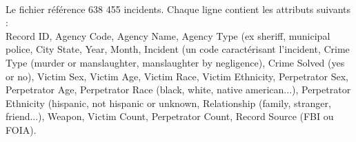 \documentclass[a4paper,10pt]{report}
\begin{document}
\paragraph{}
Le fichier référence 638 455 incidents. Chaque ligne contient les attributs suivants : \\

Record ID, Agency Code, Agency Name, Agency Type (ex sheriff, municipal police, City State, Year, Month, Incident 
(un code caractérisant l'incident, 
Crime Type (murder or manslaughter, manslaughter by negligence), Crime Solved (yes or no), Victim Sex, Victim Age, 
Victim Race, Victim Ethnicity, Perpetrator Sex, Perpetrator Age, Perpetrator Race (black, white, native american...), 
Perpetrator Ethnicity (hispanic, not hispanic or unknown,
Relationship (family, stranger, friend...), Weapon, Victim Count, Perpetrator Count, Record Source (FBI ou FOIA). 
\end{document}
